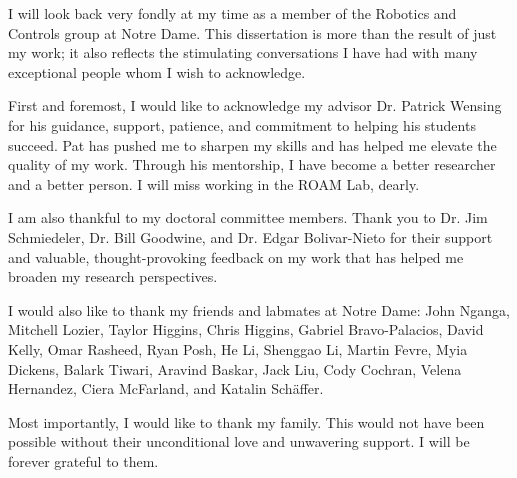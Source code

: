 \begin{acknowledge}
	I will look back very fondly at my time as a member of the Robotics and Controls group at Notre Dame. This dissertation is more than the result of just my work; it also reflects the stimulating conversations I have had with many exceptional people whom I wish to acknowledge.
	
	First and foremost, I would like to acknowledge my advisor Dr. Patrick Wensing for his guidance, support, patience, and commitment to helping his students succeed. Pat has pushed me to sharpen my skills and has helped me elevate the quality of my work. Through his mentorship, I have become a better researcher and a better person. I will miss working in the ROAM Lab, dearly.
	
	I am also thankful to my doctoral committee members. Thank you to Dr. Jim Schmiedeler, Dr. Bill Goodwine, and Dr. Edgar Bolivar-Nieto for their support and valuable, thought-provoking feedback on my work that has helped me broaden my research perspectives. 
	
	I would also like to thank my friends and labmates at Notre Dame: John Nganga, Mitchell Lozier, Taylor Higgins, Chris Higgins, Gabriel Bravo-Palacios, David Kelly, Omar Rasheed, Ryan Posh, He Li, Shenggao Li, Martin Fevre, Myia Dickens, Balark Tiwari, Aravind Baskar, Jack Liu, Cody Cochran, Velena Hernandez, Ciera McFarland, and Katalin Sch{\"a}ffer. 
	
	Most importantly, I would like to thank my family. This would not have been possible without their unconditional love and unwavering support. I will be forever grateful to them.
\end{acknowledge}